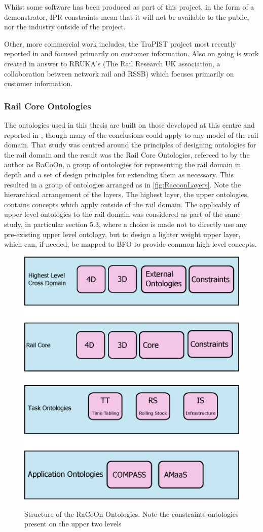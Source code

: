 Whilst some software has been produced as part of this project, in the form of a demonstrator, IPR constraints mean that it will not be available to the public, nor the industry outside of the project.

Other, more commercial work includes, the TraPIST project most recently reported in \citet{Bhatti2016} and focused primarily on customer information. Also on going is work created in answer to RRUKA's (The Rail Research UK association, a collaboration between network rail and RSSB)  which focuses primarily on customer information.

\subsubsection{Rail Core Ontologies}
\label{sec:racoon}
The ontologies used in this thesis are built on those developed at this centre and reported in \citet{Tutcher2015}, though many of the conclusions could apply to any model of the rail domain. That study was centred around the principles of designing ontologies for the rail domain and the result was the Rail Core Ontologies, refereed to by the author as RaCoOn, a group of ontologies for representing the rail domain in depth and a set of design principles for extending them as necessary. This resulted in a group of ontologies arranged as in \autoref{fig:RacoonLayers}. Note the hierarchical arrangement of the layers. The highest layer, the upper ontologies, contains concepts which apply outside of the rail domain. The applicably of upper level ontologies to the rail domain was considered as part of the same study, in particular section 5.3, where a choice is made not to directly use any pre-existing upper level ontology, but to design a lighter weight upper layer, which can, if needed, be mapped to BFO to provide common high level concepts.

\begin{figure}[htb]
\myfloatalign
{\includegraphics[width=0.6\linewidth,keepaspectratio]{gfx/RacoonLayers}}  
\caption[Racoon Layers]{Structure of the RaCoOn Ontologies. Note the constraints ontologies present on the upper two levels}
\label{fig:RacoonLayers}
\end{figure}

